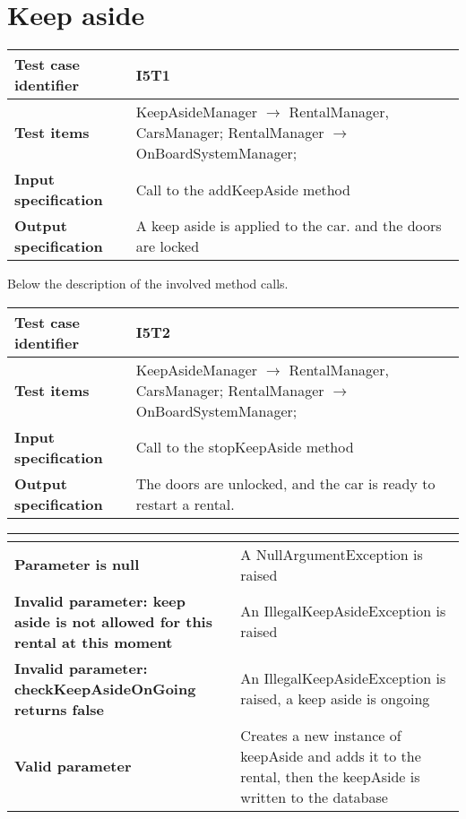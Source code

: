 \documentclass{scrreprt}
\begin{document}
\section{Keep aside}

\begin{center}
\begin{tabularx}{\columnwidth}{>{\bfseries}lX}
\toprule
Test case identifier & I5T1\\
\midrule
Test items & KeepAsideManager $\longrightarrow$ RentalManager, CarsManager;  RentalManager $\longrightarrow$ OnBoardSystemManager;\\
\midrule
Input specification & Call to the addKeepAside method\\
\midrule
Output specification & A keep aside is applied to the car. and the doors are locked\\
\bottomrule
\end{tabularx}
\end{center}

Below the description of the involved method calls.

\begin{center}
\begin{tabularx}{\columnwidth}{>{\bfseries}lX}
\toprule
Test case identifier & I5T2\\
\midrule
Test items & KeepAsideManager $\longrightarrow$ RentalManager, CarsManager;  RentalManager $\longrightarrow$ OnBoardSystemManager;\\
\midrule
Input specification & Call to the stopKeepAside method\\
\midrule
Output specification & The doors are unlocked, and the  car is ready to restart a rental.\\

\bottomrule
\end{tabularx}
\end{center}

\begin{center}
\begin{tabularx}{\columnwidth}{>{\bfseries}XX}
\toprule
\multicolumn{2}{>{\bfseries}c}{\textit{KeepAsideManager $\longrightarrow$  addKeepAside(rental)}}\\
\toprule

Parameter is null & A NullArgumentException is raised\\
\midrule
Invalid parameter: keep aside is not allowed for this rental at this moment & An IllegalKeepAsideException is raised \\
\midrule
Invalid parameter: checkKeepAsideOnGoing returns false & An IllegalKeepAsideException is raised, a keep aside is ongoing\\
\midrule
Valid parameter & Creates a new instance of keepAside and adds it to the rental, then the keepAside is written to the database\\
\bottomrule
\end{tabularx}
\end{center}
\end{document}
